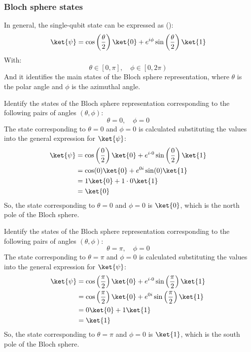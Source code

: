 \subsubsection{Bloch sphere states}\label{sec:ex-bloch-sphere-states}

In general, the single-qubit state can be expressed as ():
\begin{equation*}
    \ket{\psi} = \cos\left(\frac{\theta}{2}\right)\ket{0} + e^{i\phi}\sin\left(\frac{\theta}{2}\right)\ket{1}
\end{equation*}
With:
\begin{equation*}
    \theta \in \left[0, \pi\right], \quad \phi \in \left[0, 2\pi\right)
\end{equation*}
And it identifies the main states of the Bloch sphere representation, where $\theta$ is the polar angle and $\phi$ is the azimuthal angle.

\highspace
\exercise Identify the states of the Bloch sphere representation corresponding to the following pairs of angles $(\theta, \phi)$:
\begin{equation*}
    \theta = 0, \quad \phi = 0
\end{equation*}
\solution The state corresponding to $\theta = 0$ and $\phi = 0$ is calculated substituting the values into the general expression for $\ket{\psi}$:
\begin{equation*}
    \begin{aligned}
        \ket{\psi} &= \cos\left(\frac{0}{2}\right)\ket{0} + e^{i \cdot 0}\sin\left(\frac{0}{2}\right)\ket{1} \\
        &= \cos(0)\ket{0} + e^{0i}\sin(0)\ket{1} \\
        &= 1\ket{0} + 1 \cdot 0\ket{1} \\
        &= \ket{0}
    \end{aligned}
\end{equation*}
So, the state corresponding to $\theta = 0$ and $\phi = 0$ is $\ket{0}$, which is the north pole of the Bloch sphere.

\highspace
\exercise Identify the states of the Bloch sphere representation corresponding to the following pairs of angles $(\theta, \phi)$:
\begin{equation*}
    \theta = \pi, \quad \phi = 0
\end{equation*}
\solution The state corresponding to $\theta = \pi$ and $\phi = 0$ is calculated substituting the values into the general expression for $\ket{\psi}$:
\begin{equation*}
    \begin{aligned}
        \ket{\psi} &= \cos\left(\frac{\pi}{2}\right)\ket{0} + e^{i \cdot 0}\sin\left(\frac{\pi}{2}\right)\ket{1} \\
        &= \cos\left(\frac{\pi}{2}\right)\ket{0} + e^{0i}\sin\left(\frac{\pi}{2}\right)\ket{1} \\
        &= 0\ket{0} + 1\ket{1} \\
        &= \ket{1}
    \end{aligned}
\end{equation*}
So, the state corresponding to $\theta = \pi$ and $\phi = 0$ is $\ket{1}$, which is the south pole of the Bloch sphere.

